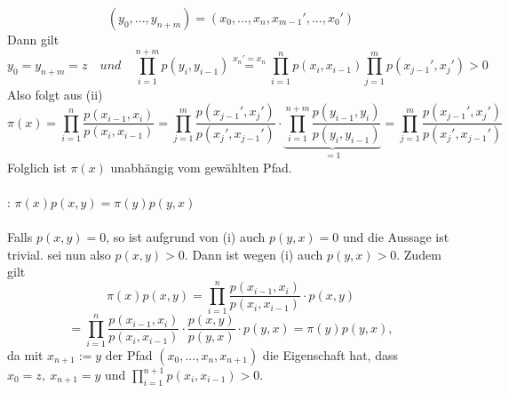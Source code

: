 \begin{equation*}
(y_{0},...,y_{n+m}) = (x_{0},...,x_{n},x_{m-1}',...,x_{0}')
\end{equation*}
Dann gilt
\begin{equation*}
y_{0} = y_{n+m} = z \quad und \quad \prod_{i=1}^{n+m} p(y_{i},y_{i-1}) \stackrel{x_{n}'=x_{n}}{=} \prod_{i=1}^{n} p(x_{i},x_{i-1})  \prod_{j=1}^{m} p(x_{j-1}',x_{j}')>0
\end{equation*}
Also folgt aus (ii)
\begin{equation*}
\pi(x) = \prod_{i=1}^{n} \dfrac{p(x_{i-1},x_{i})}{p(x_{i},x_{i-1})} = \prod_{j=1}^{m} \dfrac{p(x_{j-1}',x_{j}')}{p(x_{j}',x_{j-1}')} \cdot \underbrace{\prod_{i=1}^{n+m} \dfrac{p(y_{i-1},y_{i})}{p(y_{i},y_{i-1})}} _{=1} = \prod_{j=1}^{m} \dfrac{p(x_{j-1}',x_{j}')}{p(x_{j}',x_{j-1}')}
\end{equation*}
Folglich ist $\pi(x)$ unabhängig vom gewählten Pfad.
\\
\\
: $\pi(x)p(x,y) = \pi(y) p(y,x)$
\\
\\
Falls $p(x,y)=0$, so ist aufgrund von (i) auch $p(y,x)=0$ und die Aussage ist trivial. sei nun also $p(x,y)>0$. Dann ist wegen (i) auch $p(y,x)>0$. Zudem gilt
\begin{equation*}
\pi(x)p(x,y) = \prod_{i=1}^{n} \dfrac{p(x_{i-1},x_{i})}{p(x_{i},x_{i-1})}  \cdot p(x,y)
\end{equation*}
\begin{equation*}
= \prod_{i=1}^{n} \dfrac{p(x_{i-1},x_{i})}{p(x_{i},x_{i-1})}  \cdot \dfrac{p(x,y)}{p(y,x)} \cdot p(y,x) = \pi(y)p(y,x),
\end{equation*}
da mit $x_{n+1}:= y$ der Pfad $(x_{0},...,x_{n},x_{n+1})$ die Eigenschaft hat, dass $x_{0} = z, \: x_{n+1} = y$ und $\prod_{i=1}^{n+1} p(x_{i},x_{i-1})>0$.